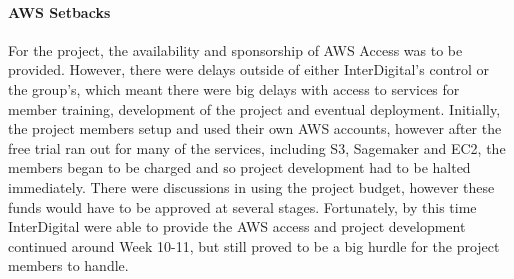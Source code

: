 \paragraph{AWS Setbacks}
For the project, the availability and sponsorship of AWS Access was to be provided. However, there were delays outside of either InterDigital's control or the group's, which meant there were big delays with access to services for member training, development of the project and eventual deployment. Initially, the project members setup and used their own AWS accounts, however after the free trial ran out for many of the services, including S3, Sagemaker and EC2, the members began to be charged and so project development had to be halted immediately. There were discussions in using the project budget, however these funds would have to be approved at several stages. Fortunately, by this time InterDigital were able to provide the AWS access and project development continued around Week 10-11, but still proved to be a big hurdle for the project members to handle. 



















